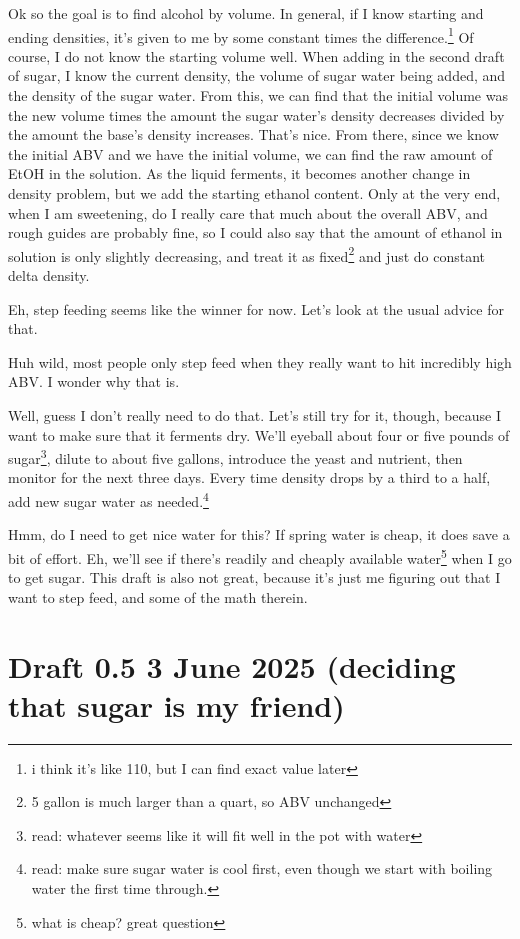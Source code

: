 \documentclass[12pt]{article}
\renewcommand{\,}{\textsuperscript{,}}
\begin{document}
Ok so the goal is to find alcohol by volume.  
In general, if I know starting and ending densities, it's given to me by some constant times the difference.\footnote{i think it's like 110, but I can find exact value later}  
Of course, I do not know the starting volume well.  
When adding in the second draft of sugar, I know the current density, the volume of sugar water being added, and the density of the sugar water.  
From this, we can find that the initial volume was the new volume times the amount the sugar water's density decreases divided by the amount the base's density increases.  
That's nice.  
From there, since we know the initial ABV and we have the initial volume, we can find the raw amount of EtOH in the solution.  
As the liquid ferments, it becomes another change in density problem, but we add the starting ethanol content.  
Only at the very end, when I am sweetening, do I really care that much about the overall ABV, and rough guides are probably fine, so I could also say that the amount of ethanol in solution is only slightly decreasing, and treat it as fixed\footnote{5 gallon is much larger than a quart, so ABV unchanged} and just do constant delta density.

Eh, step feeding seems like the winner for now. Let's look at the usual advice for that.

Huh wild, most people only step feed when they really want to hit incredibly high ABV.  
I wonder why that is.

Well, guess I don't really need to do that.  
Let's still try for it, though, because I want to make sure that it ferments dry.  
We'll eyeball about four or five pounds of sugar\footnote{read: whatever seems like it will fit well in the pot with water}, dilute to about five gallons, introduce the yeast and nutrient, then monitor for the next three days.  
Every time density drops by a third to a half, add new sugar water as needed.\footnote{read: make sure sugar water is cool first, even though we start with boiling water the first time through.}

Hmm, do I need to get nice water for this?  
If spring water is cheap, it does save a bit of effort.  
Eh, we'll see if there's readily and cheaply available water\footnote{what is cheap? great question} when I go to get sugar.  
This draft is also not great, because it's just me figuring out that I want to step feed, and some of the math therein.

\section{Draft 0.5 3 June 2025 (deciding that sugar is my friend)}
\end{document}
